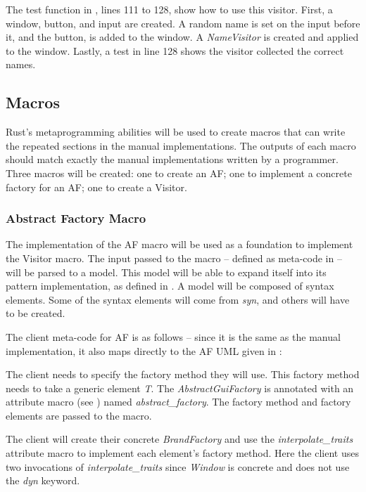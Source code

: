 The test function in , lines 111 to 128, show how to use this visitor.
First, a window, button, and input are created.
A random name is set on the input before it, and the button, is added to the window.
A \textit{NameVisitor} is created and applied to the window.
Lastly, a test in line 128 shows the visitor collected the correct names.

\subsection{Macros}
Rust's metaprogramming abilities will be used to create macros that can write the repeated sections in the manual implementations.
The outputs of each macro should match exactly the manual implementations written by a programmer.
Three macros will be created: one to create an AF; one to implement a concrete factory for an AF; one to create a Visitor.

\subsubsection{Abstract Factory Macro}
The implementation of the AF macro will be used as a foundation to implement the Visitor macro.
The input passed to the macro -- defined as meta-code in  -- will be parsed to a model.
This model will be able to expand itself into its pattern implementation, as defined in .
A model will be composed of syntax elements.
Some of the syntax elements will come from \textit{syn}, and others will have to be created.

The client meta-code for AF is as follows -- since it is the same as the manual implementation, it also maps directly to the AF UML given in :


The client needs to specify the factory method they will use.
This factory method needs to take a generic element \textit{T}.
The \textit{AbstractGuiFactory} is annotated with an attribute macro (see ) named \textit{abstract\_factory}.
The factory method and factory elements are passed to the macro.

The client will create their concrete \textit{BrandFactory} and use the \textit{interpolate\_traits} attribute macro to implement each element's factory method.
Here the client uses two invocations of \textit{interpolate\_traits} since \textit{Window} is concrete and does not use the \textit{dyn} keyword.

